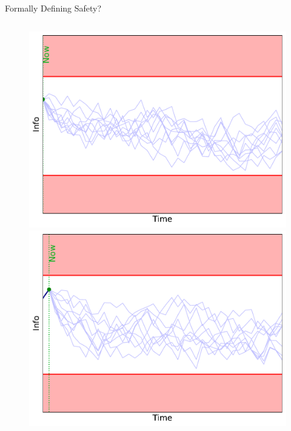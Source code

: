 \documentclass[lecture]{beamer}
\begin{document}
\begin{frame}{\normalsize Formally Defining Safety?}
\begin{columns}[t]
\begin{overlayarea}{\textwidth}{0.3\textheight}
\begin{figure}
        {%
       \hspace{-1.5cm}   \includegraphics[width=\FS\textwidth]{Codes/BasicsSafety/Safe0.pdf}%
        }%
        {%
        \hspace{-1.5cm}            \includegraphics[width=\FS\textwidth]{Codes/BasicsSafety/Safe1.pdf}
        }%
        {%
}
\end{figure}
\end{overlayarea}
\end{columns}
\end{frame}
\end{document}
